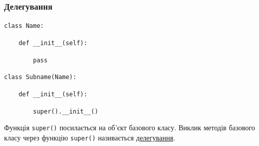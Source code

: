 \begin{frame}
\frametitle{Делегування}
\texttt{class Name:}

\texttt{~~~~def \_\_init\_\_(self):}

\texttt{~~~~~~~~pass}

\texttt{class Subname(Name):}

\texttt{~~~~def \_\_init\_\_(self):}

\texttt{~~~~~~~~super().\_\_init\_\_()}
 
Функція \texttt{super()} посилається на об'єкт базового класу. Виклик методів базового класу через функцію \texttt{super()}  називається \underline{делегування}.
\end{frame}
